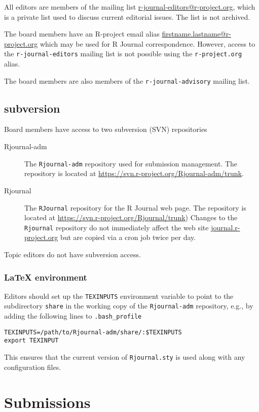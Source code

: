 \documentclass[11pt]{article}
\begin{document}
All editors are members of the mailing list
\url{r-journal-editors@r-project.org}, which is a private list used to
discuss current editorial issues. The list is not archived.
 
The board members have an R-project email alias
\url{firstname.lastname@r-project.org} which may be used for R Journal
correspondence.  However, access to the \verb+r-journal-editors+ mailing list
is not possible using the \verb+r-project.org+ alias.

The board members are also members of the \verb+r-journal-advisory+
mailing list.

\subsection{subversion}

Board members have access to two subversion (SVN) repositories
\begin{description}
\item[Rjournal-adm] The \texttt{Rjournal-adm} repository used for
  submission management. The repository is located at
  \url{https://svn.r-project.org/Rjournal-adm/trunk}.
\item[Rjournal] The \texttt{RJournal} repository for the R Journal web
  page. The repository is located at
  \url{https://svn.r-project.org/Rjournal/trunk}) Changes to the
  \texttt{Rjournal} repository do not immediately affect the web site
  \url{journal.r-project.org} but are copied via a cron job twice per
  day.
\end{description}
Topic editors do not have subversion access.

\subsubsection{LaTeX environment}

Editors should set up the \texttt{TEXINPUTS} environment variable to
point to the subdirectory \texttt{share} in the working copy of the
\texttt{Rjournal-adm} repository, e.g., by adding the following lines to
\verb+.bash_profile+

\begin{verbatim}
TEXINPUTS=/path/to/Rjournal-adm/share/:$TEXINPUTS
export TEXINPUT
\end{verbatim}

This ensures that the current version of \texttt{Rjournal.sty} is used
along with any configuration files.

\section{Submissions}
\end{document}
